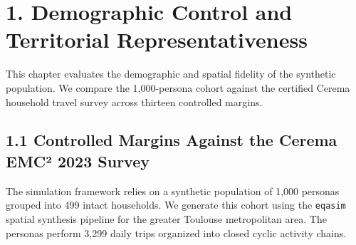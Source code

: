 \section{1. Demographic Control and Territorial Representativeness}

This chapter evaluates the demographic and spatial fidelity of the synthetic population. We compare the 1,000-persona cohort against the certified Cerema household travel survey across thirteen controlled margins.

\subsection{1.1 Controlled Margins Against the Cerema EMC² 2023 Survey}

The simulation framework relies on a synthetic population of 1,000 personas grouped into 499 intact households. We generate this cohort using the \texttt{eqasim} spatial synthesis pipeline for the greater Toulouse metropolitan area. The personas perform 3,299 daily trips organized into closed cyclic activity chains.

